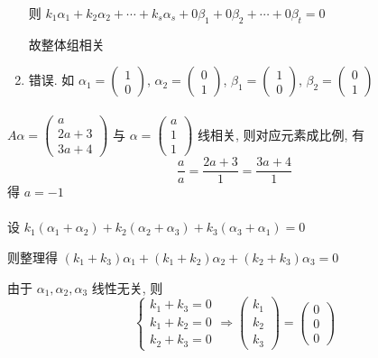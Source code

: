 \begin{enumerate}
			       则 \( k_{1}\alpha_{1} + k_{2}\alpha_{2} + \cdots + k_{s}\alpha_{s} + 0\beta_{1} + 0\beta_{2} + \cdots + 0\beta_{t} = 0 \)

			       故整体组相关
			 \item %
			       错误. 如 \( \alpha_{1} =
			       \begin{pmatrix}
				       1 \\
				       0\end{pmatrix} \), \( \alpha_{2} =
			       \begin{pmatrix}
				       0 \\
				       1\end{pmatrix} \), \( \beta_{1} =
			       \begin{pmatrix}
				       1 \\
				       0\end{pmatrix} \), \( \beta_{2} =
			       \begin{pmatrix}
				       0 \\
				       1\end{pmatrix} \)
		 \end{enumerate}


	 \paragraph{} %
		 \( A\alpha =
		 \begin{pmatrix}
			 a    \\
			 2a+3 \\
			 3a+4\end{pmatrix} \) 与 \( \alpha =
		 \begin{pmatrix}
			 a \\
			 1 \\
			 1\end{pmatrix} \) 线相关, 则对应元素成比例, 有
		 \[
			 \frac{a}{a} = \frac{2a+3}{1} = \frac{3a+4}{1}
		 \]
		 得 \( a = -1 \)


	 \paragraph{} %
		 设 \( k_{1}(\alpha_{1} + \alpha_{2}) + k_{2}(\alpha_{2} + \alpha_{3}) + k_{3}(\alpha_{3} + \alpha_{1}) = 0 \)

		 则整理得 \( (k_{1} + k_{3})\alpha_{1} + (k_{1} + k_{2})\alpha_{2} + (k_{2} + k_{3})\alpha_{3} = 0 \)

		 由于 \( \alpha_{1}, \alpha_{2}, \alpha_{3} \) 线性无关, 则
		 \[ \begin{cases} k_{1} + k_{3} = 0 \\
				 k_{1} + k_{2} = 0 \\
				 k_{2} + k_{3} = 0\end{cases} \Rightarrow
			 \begin{pmatrix}
				 k_{1} \\
				 k_{2} \\
				 k_{3}\end{pmatrix} =
			 \begin{pmatrix}
				 0 \\
				 0 \\
				 0\end{pmatrix} \]


